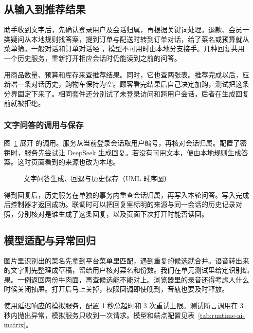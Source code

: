 \subsection{从输入到推荐结果}

助手收到文字后，先确认登录用户及会话归属，再根据关键词处理。退款、会员一类疑问从本地规则找答案，提到订单与配送时转到订单对话，给了菜名或预算就从菜单筛。一般对话和订单对话经 ，模型不可用时由本地分支接手。几种回复共用一个历史服务，重新打开相应会话时仍能读到之前的问答。

 用商品数量、预算和库存来查推荐结果。同时，它也查两张表。推荐完成以后，应新增一条对话历史，购物车保持为空。顾客看完结果后自己决定加购，测试把这条分界固定下来了。相同套件还分别试了未登录访问和跨用户会话，后者在生成回复前就被拒绝。

\subsubsection{文字问答的调用与保存}

图~\ref{fig:ai-chat-history-sequence-uml} 展开  的调用。服务从当前登录会话取用户编号，再核对会话归属。配置了密钥时，服务先尝试让 DeepSeek 生成回复。若没有可用文本，便由本地规则生成答案。这时页面看到的来源也改为本地。

\begin{figure}[!htbp]
  \centering
  
  \caption{文字问答生成、回退与历史保存（UML 时序图）}\label{fig:ai-chat-history-sequence-uml}
\end{figure}

得到回复后，历史服务在单独的事务内重查会话归属，再写入本轮问答。写入完成后控制器才返回成功。联调时可以把回复里标明的来源与同一会话的历史记录对照，分别核对是谁生成了这条回复，以及页面下次打开时能否读回。

\subsection{模型适配与异常回归}

图片里识别出的菜名先拿到平台菜单里匹配，遇到重复的候选就合并。语音转出来的文字则先整理成草稿，留给用户核对菜名和份数。我们在单元测试里给定识别结果。一例返回两份牛肉面，再查候选能不能对上。浏览器里的录音还得考虑人什么时候关闭抽屉。打开后马上关掉，权限回调即使晚到，音轨也要及时释放。

 使用延迟响应的模拟服务，配置 1 秒总超时和 3 次重试上限。测试断言调用在 3 秒内抛出异常，模拟服务只收到一次请求。模型和端点配置见表~\ref{tab:runtime-ai-matrix}。

